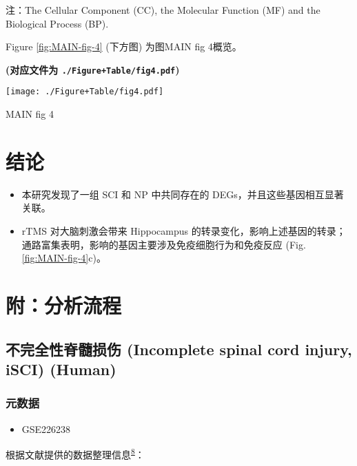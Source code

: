 \documentclass[
]{article}
\providecommand{\tightlist}{%
  \setlength{\itemsep}{0pt}\setlength{\parskip}{0pt}}
\begin{document}
注：The Cellular Component (CC), the Molecular Function (MF) and the Biological Process (BP).

Figure \ref{fig:MAIN-fig-4} (下方图) 为图MAIN fig 4概览。

\textbf{(对应文件为 \texttt{./Figure+Table/fig4.pdf})}

\def\@captype{figure}
\begin{center}
\texttt{[image: ./Figure+Table/fig4.pdf]}
\caption{MAIN fig 4}\label{fig:MAIN-fig-4}
\end{center}

\hypertarget{dis}{%
\section{结论}\label{dis}}

\begin{itemize}
\tightlist
\item
  本研究发现了一组 SCI 和 NP 中共同存在的 DEGs，并且这些基因相互显著关联。
\item
  rTMS 对大脑刺激会带来 Hippocampus 的转录变化，影响上述基因的转录；通路富集表明，影响的基因主要涉及免疫细胞行为和免疫反应 (Fig. \ref{fig:MAIN-fig-4}c)。
\end{itemize}

\hypertarget{workflow}{%
\section{附：分析流程}\label{workflow}}

\hypertarget{ux4e0dux5b8cux5168ux6027ux810aux9ad3ux635fux4f24-incomplete-spinal-cord-injury-isci-human}{%
\subsection{不完全性脊髓损伤 (Incomplete spinal cord injury, iSCI) (Human)}\label{ux4e0dux5b8cux5168ux6027ux810aux9ad3ux635fux4f24-incomplete-spinal-cord-injury-isci-human}}

\hypertarget{ux5143ux6570ux636e}{%
\subsubsection{元数据}\label{ux5143ux6570ux636e}}

\begin{itemize}
\tightlist
\item
  GSE226238
\end{itemize}

根据文献提供的数据整理信息\textsuperscript{\protect\hyperlink{ref-ProfilingImmunMorris2023}{8}}：
\end{document}
